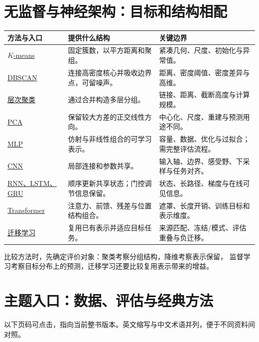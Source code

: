 \section{无监督与神经架构：目标和结构相配}
\label{sec:reference-architectures}
\begingroup
\setlength{\LTpre}{3pt}\setlength{\LTpost}{4pt}
\begin{xltabular}{\textwidth}{P{30mm}P{52mm}Y}
\toprule
方法与入口 & 提供什么结构 & 关键边界\\
\midrule
\endhead
\bottomrule
\endfoot
\hyperref[sec:unsup-kmeans]{$K$-means} & 固定簇数，以平方距离和聚组。 & 紧凑几何、尺度、初始化与异常值。\\
\hyperref[sec:unsup-dbscan]{DBSCAN} & 连接高密度核心并吸收边界点，可留噪声。 & 距离、密度阈值、密度差异与高维。\\
\hyperref[sec:unsup-hierarchy]{层次聚类} & 通过合并构造多层分组。 & 链接、距离、截断高度与计算规模。\\
\hyperref[sec:unsup-pca]{PCA} & 保留较大方差的正交线性方向。 & 中心化、尺度、重建与预测用途不同。\\
\hyperref[sec:nn-structure]{MLP} & 仿射与非线性组合的可学习表示。 & 容量、数据、优化与过拟合；需完整评估流程。\\
\hyperref[ch:cnn]{CNN} & 局部连接和参数共享。 & 输入轴、边界、感受野、下采样与任务对齐。\\
\hyperref[sec:seq-rnn]{RNN、LSTM、GRU} & 顺序更新共享状态；门控调节信息保留。 & 状态、长路径、梯度与在线可见信息。\\
\hyperref[sec:seq-transformer]{Transformer} & 注意力、前馈、残差与位置结构组合。 & 遮罩、长度开销、训练目标和表示维度。\\
\hyperref[ch:transfer]{迁移学习} & 复用已有表示并适应目标任务。 & 来源匹配、冻结/模式、评估重叠与负迁移。\\

\end{xltabular}
\endgroup

比较方法时，先确定评价对象：聚类考察分组结构，降维考察表示保留，
监督学习考察目标分布上的预测，迁移学习还要比较复用表示带来的增益。

\section{主题入口：数据、评估与经典方法}
\label{sec:reference-topics}
以下页码可点击，指向当前整书版本。英文缩写与中文术语并列，便于不同资料间对照。

